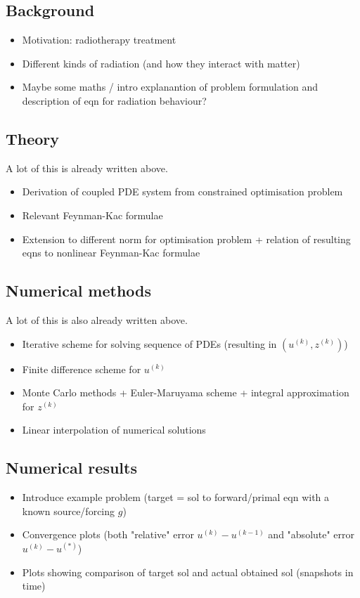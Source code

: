 \documentclass{article}  %
\begin{document}
\subsection{Background}
\begin{itemize}
    \item Motivation: radiotherapy treatment 
    \item Different kinds of radiation (and how they interact with matter) 
    \item Maybe some maths / intro explanantion of problem formulation and description of eqn for radiation behaviour?
\end{itemize}

\subsection{Theory}
A lot of this is already written above.
\begin{itemize}
    \item Derivation of coupled PDE system from constrained optimisation problem 
    \item Relevant Feynman-Kac formulae 
    \item Extension to different norm for optimisation problem + relation of resulting eqns to nonlinear Feynman-Kac formulae
\end{itemize}

\subsection{Numerical methods}
A lot of this is also already written above.
\begin{itemize}
    \item Iterative scheme for solving sequence of PDEs (resulting in $(u^{(k)},z^{(k)})$)
    \item Finite difference scheme for $u^{(k)}$
    \item Monte Carlo methods + Euler-Maruyama scheme + integral approximation for $z^{(k)}$
    \item Linear interpolation of numerical solutions
\end{itemize}

\subsection{Numerical results}
\begin{itemize}
    \item Introduce example problem (target = sol to forward/primal eqn with a known source/forcing $g$)
    \item Convergence plots (both "relative" error $u^{(k)} - u^{(k-1)}$ and "absolute" error $u^{(k)}-u^{(*)}$)
    \item Plots showing comparison of target sol and actual obtained sol (snapshots in time)
\end{itemize}
\end{document}
